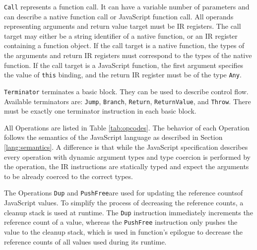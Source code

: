 \texttt{Call} represents a function call. It can have a variable number of parameters and can describe a native function call or JavaScript function call. All operands representing arguments and return value target must be IR registers. The call target may either be a string identifier of a native function, or an IR register containing a function object. If the call target is a native function, the types of the arguments and return IR registers must correspond to the types of the native function. If the call target is a JavaScript function, the first argument specifies the value of \texttt{this} binding, and the return IR register must be of the type \texttt{Any}.

\texttt{Terminator} terminates a basic block. They can be used to describe control flow. Available terminators are: \texttt{Jump}, \texttt{Branch}, \texttt{Return}, \texttt{ReturnValue}, and \texttt{Throw}. There must be exactly one terminator instruction in each basic block.

All Operations are listed in Table \ref{tab:opcodes}. The behavior of each Operation follows the semantics of the JavaScript language as described in Section \ref{lang:semantics}. A difference is that while the JavaScript specification describes every operation with dynamic argument types and type coercion is performed by the operation, the IR instructions are statically typed and expect the arguments to be already coerced to the correct types.

The Operations \texttt{Dup} and \texttt{PushFree}\footnotemark[1] are used for updating the reference counts\footnotemark[2] of JavaScript values. To simplify the process of decreasing the reference counts, a cleanup stack is used at runtime. The \texttt{Dup} instruction immediately increments the reference count of a value, whereas the \texttt{PushFree} instruction only pushes the value to the cleanup stack, which is used in function's epilogue to decrease the reference counts of all values used during its runtime.




